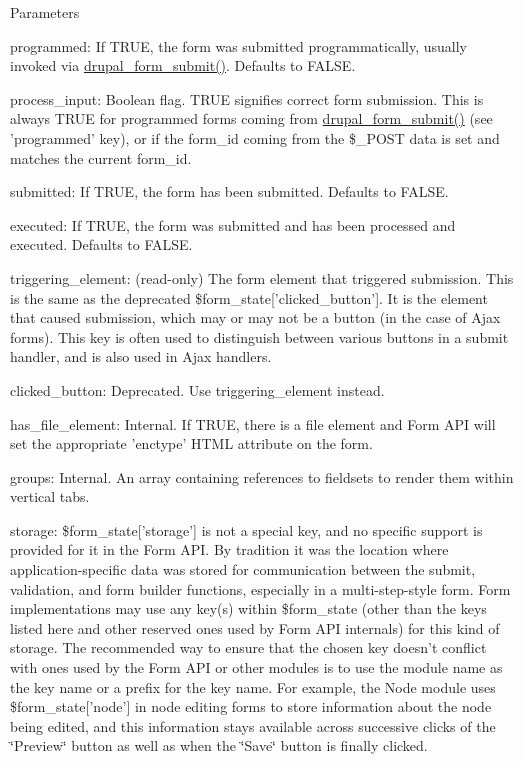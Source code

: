 \begin{DoxyParams}{Parameters}
\begin{DoxyItemize}
\item programmed: If TRUE, the form was submitted programmatically, usually invoked via \hyperlink{group__form__api_ga4312d7fe0602f6359153fc62cba1ca24}{drupal\_\-form\_\-submit()}. Defaults to FALSE.
\item process\_\-input: Boolean flag. TRUE signifies correct form submission. This is always TRUE for programmed forms coming from \hyperlink{group__form__api_ga4312d7fe0602f6359153fc62cba1ca24}{drupal\_\-form\_\-submit()} (see 'programmed' key), or if the form\_\-id coming from the \$\_\-POST data is set and matches the current form\_\-id.
\item submitted: If TRUE, the form has been submitted. Defaults to FALSE.
\item executed: If TRUE, the form was submitted and has been processed and executed. Defaults to FALSE.
\item triggering\_\-element: (read-\/only) The form element that triggered submission. This is the same as the deprecated \$form\_\-state\mbox{[}'clicked\_\-button'\mbox{]}. It is the element that caused submission, which may or may not be a button (in the case of Ajax forms). This key is often used to distinguish between various buttons in a submit handler, and is also used in Ajax handlers.
\item clicked\_\-button: Deprecated. Use triggering\_\-element instead.
\item has\_\-file\_\-element: Internal. If TRUE, there is a file element and Form API will set the appropriate 'enctype' HTML attribute on the form.
\item groups: Internal. An array containing references to fieldsets to render them within vertical tabs.
\item storage: \$form\_\-state\mbox{[}'storage'\mbox{]} is not a special key, and no specific support is provided for it in the Form API. By tradition it was the location where application-\/specific data was stored for communication between the submit, validation, and form builder functions, especially in a multi-\/step-\/style form. Form implementations may use any key(s) within \$form\_\-state (other than the keys listed here and other reserved ones used by Form API internals) for this kind of storage. The recommended way to ensure that the chosen key doesn't conflict with ones used by the Form API or other modules is to use the module name as the key name or a prefix for the key name. For example, the Node module uses \$form\_\-state\mbox{[}'node'\mbox{]} in node editing forms to store information about the node being edited, and this information stays available across successive clicks of the \char`\"{}Preview\char`\"{} button as well as when the \char`\"{}Save\char`\"{} button is finally clicked.

\end{DoxyItemize}
\end{DoxyParams}
